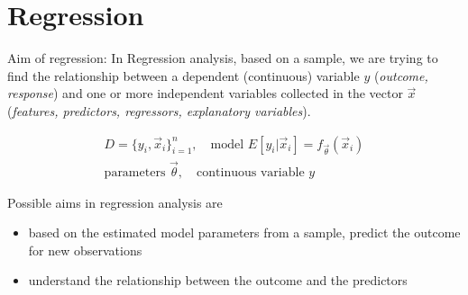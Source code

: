 \section{Regression}
\thispagestyle{plain}

\textcolor{blue1}{Aim of regression:} In Regression analysis, based on a sample,
we are trying to find the relationship between a dependent (continuous) variable
$y$ (\textit{outcome, response}) and one or more independent variables collected 
in the vector $\vec{x}$ (\textit{features, predictors, regressors, explanatory variables}).

\begin{equation}
    \begin{gathered}
        D = \{ y_i, \vec{x}_i \}_{i=1}^n, \quad \text{model } E[y_i|\vec{x}_i] = f_\vec{\theta}(\vec{x}_i) \\
        \text{parameters } \vec{\theta}, \quad \text{continuous variable } y
    \end{gathered}
\end{equation}

Possible aims in regression analysis are
\begin{itemize}
    \item based on the estimated model parameters from a sample, predict the outcome for new observations
    \item understand the relationship between the outcome and the predictors
\end{itemize}

